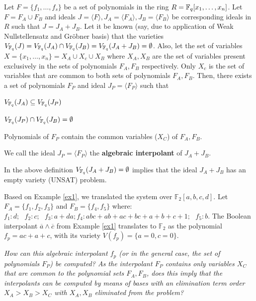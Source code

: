 \begin{Definition}\label{ci}
Let $F = \{f_1, \dots, f_s\}$ be a set of polynomials in the ring 
$R = {\mathbb{F}}_{q}[x_1,\dots,x_n]$. Let $F = F_A \cup F_B$ and ideals $J =
\langle F \rangle, J_A = \langle F_A \rangle, J_B = \langle F_B
\rangle$ be corresponding ideals in $R$ such that $J = J_A + J_B$. Let
it be known (say, due to application of Weak Nullstellensatz and
Gr\"obner basis) that the varieties $V_{{\mathbb{F}}_{q}}(J) = V_{{\mathbb{F}}_{q}}(J_A) \cap
V_{{\mathbb{F}}_{q}}(J_B) =V_{{\mathbb{F}}_{q}}(J_A+J_B)=\emptyset$. Also, let the set of
variables $X = \{x_1,\dots,x_n\} = X_A \cup X_c \cup X_B$ where $X_A,
X_B$ are the set of variables present exclusively in the sets of
polynomials $F_A, F_B$ respectively. Only $X_c$ is the set of
variables that are common to both sets of polynomials $F_A,
F_B$. Then, there exists a set of polynomials  $F_P$ and ideal $J_P =
\langle F_P \rangle$ such that 
\bi
\item $V_{{\mathbb{F}}_{q}}(J_A) \subseteq V_{{\mathbb{F}}_{q}}(J_P)$
\item $V_{{\mathbb{F}}_{q}}(J_P) \cap V_{{\mathbb{F}}_{q}}(J_B) = \emptyset$
\item Polynomials of $F_P$ contain the common variables ($X_C$) of
  $F_A, F_B$. 
\ei

We call the ideal $J_P = \langle F_P\rangle$ the {\bf algebraic
  interpolant} of  $J_A+J_B$. 
\end{Definition}

In the above definition $V_{{\mathbb{F}}_{q}}(J_A+J_B)=\emptyset$ implies that the
ideal $J_A+J_B$ has an empty variety (UNSAT) problem. 

\begin{Example} \label{ex2}
Based on Example \ref{ex1}, we translated the system over
$\mathbb{F}_2[a, b, c, d]$. Let $F_A = \{f_1, f_2, f_3\}$ and $F_B =
\{f_4, f_5\}$ where: $f_1: d; ~~~f_2: c; ~~~f_3: a + da; f_4:  abc +
ab + ac + bc + a + b + c + 1; ~~~f_5: b.$ The Boolean interpolant
$\overline{a}\wedge\overline{c}$ from Example \ref{ex1} translates to
${\mathbb{F}}_2$ as the polynomial $f_p = ac + a + c$, with its
variety $V(f_p) = \{a=0, c=0\}$.   
\end{Example}

\begin{Problem}
{\it How can this algebraic interpolant $f_p$ (or in the general case,
  the set of polynomials $F_P$) be computed? As the interpolant $F_P$ 
contains only variables $X_C$ that are common to the polynomial sets
$F_A, F_B$, does this imply that the interpolants can be computed by
means of \Grobner bases with an elimination term order $X_A>X_B>X_C$
with $X_A, X_B$ eliminated from the problem? }
\end{Problem} 

